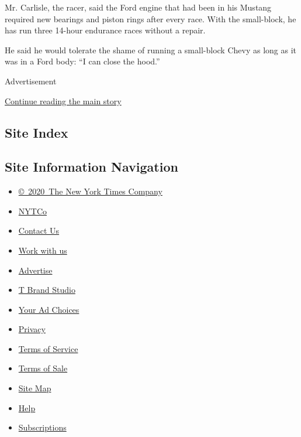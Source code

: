 Mr. Carlisle, the racer, said the Ford engine that had been in his
Mustang required new bearings and piston rings after every race. With
the small-block, he has run three 14-hour endurance races without a
repair.

He said he would tolerate the shame of running a small-block Chevy as
long as it was in a Ford body: ``I can close the hood.''

Advertisement

\protect\hyperlink{after-bottom}{Continue reading the main story}

\hypertarget{site-index}{%
\subsection{Site Index}\label{site-index}}

\hypertarget{site-information-navigation}{%
\subsection{Site Information
Navigation}\label{site-information-navigation}}

\begin{itemize}
\tightlist
\item
  \href{https://help.nytimes3xbfgragh.onion/hc/en-us/articles/115014792127-Copyright-notice}{©~2020~The
  New York Times Company}
\end{itemize}

\begin{itemize}
\tightlist
\item
  \href{https://www.nytco.com/}{NYTCo}
\item
  \href{https://help.nytimes3xbfgragh.onion/hc/en-us/articles/115015385887-Contact-Us}{Contact
  Us}
\item
  \href{https://www.nytco.com/careers/}{Work with us}
\item
  \href{https://nytmediakit.com/}{Advertise}
\item
  \href{http://www.tbrandstudio.com/}{T Brand Studio}
\item
  \href{https://www.nytimes3xbfgragh.onion/privacy/cookie-policy\#how-do-i-manage-trackers}{Your
  Ad Choices}
\item
  \href{https://www.nytimes3xbfgragh.onion/privacy}{Privacy}
\item
  \href{https://help.nytimes3xbfgragh.onion/hc/en-us/articles/115014893428-Terms-of-service}{Terms
  of Service}
\item
  \href{https://help.nytimes3xbfgragh.onion/hc/en-us/articles/115014893968-Terms-of-sale}{Terms
  of Sale}
\item
  \href{https://spiderbites.nytimes3xbfgragh.onion}{Site Map}
\item
  \href{https://help.nytimes3xbfgragh.onion/hc/en-us}{Help}
\item
  \href{https://www.nytimes3xbfgragh.onion/subscription?campaignId=37WXW}{Subscriptions}
\end{itemize}
